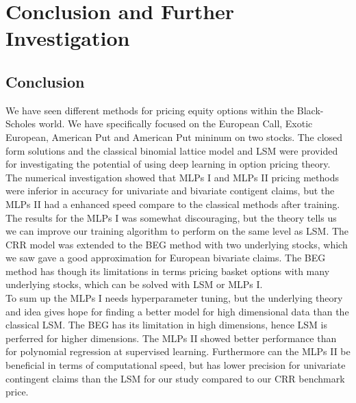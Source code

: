 
\chapter{Conclusion and Further Investigation} %

\label{Chapter7} %


\section{Conclusion}
We have seen different methods for pricing equity options within the Black-Scholes world. We have specifically focused on the European Call, Exotic European, American Put and American Put mininum on two stocks. The closed form solutions and the classical binomial lattice model and LSM were provided for investigating the potential of using deep learning in option pricing theory. \\

The numerical investigation showed that MLPs I and MLPs II pricing methods were inferior in accuracy for univariate and bivariate contigent claims, but the MLPs II had a enhanced speed compare to the classical methods after training. The results for the MLPs I was somewhat discouraging, but the theory tells us we can improve our training algorithm to perform on the same level as LSM. The CRR model was extended to the BEG method with two underlying stocks, which we saw gave a good approximation for European bivariate claims. The BEG method has though its limitations in terms pricing basket options with many underlying stocks, which can be solved with LSM or MLPs I.\\

To sum up the MLPs I needs hyperparameter tuning, but the underlying theory and idea gives hope for finding a better model for high dimensional data than the classical LSM. The BEG has its limitation in high dimensions, hence LSM is perferred for higher dimensions. The MLPs II showed better performance than for polynomial regression at supervised learning. Furthermore can the MLPs II be beneficial in terms of computational speed, but has lower precision for univariate contingent claims than the LSM for our study compared to our CRR benchmark price.

